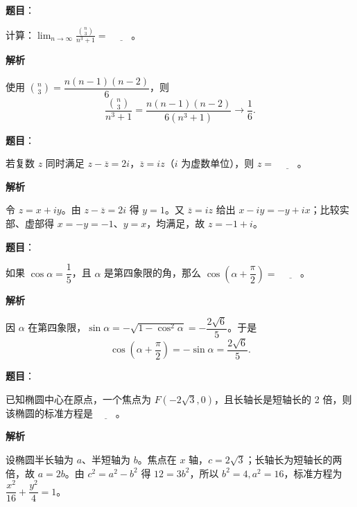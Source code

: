 \begin{answer}

\textbf{题目}：

计算：$\displaystyle\lim_{n\to\infty}\frac{\binom n3}{n^3+1}=$ $\underline{\qquad}$。

\textbf{解析}

使用 $\binom n3=\dfrac{n(n-1)(n-2)}6$，则
\nopagebreak[4]
\[
\frac{\binom n3}{n^3+1}
=\frac{n(n-1)(n-2)}{6(n^3+1)}\longrightarrow\frac16.
\]


\end{answer}
\begin{answer}

\textbf{题目}：

若复数 $z$ 同时满足 $z-\overline z=2i$，$\overline z=iz$（$i$ 为虚数单位），则 $z=$ $\underline{\qquad}$。

\textbf{解析}

令 $z=x+iy$。由 $z-\overline z=2i$ 得 $y=1$。又 $\overline z=iz$ 给出 $x-iy=-y+ix$；比较实部、虚部得 $x=-y=-1$、$y=x$，均满足，故 $z=-1+i$。


\end{answer}
\begin{answer}

\textbf{题目}：

如果 $\cos\alpha=\dfrac15$，且 $\alpha$ 是第四象限的角，那么 $\cos\left(\alpha+\dfrac\pi2\right)=$ $\underline{\qquad}$。

\textbf{解析}

因 $\alpha$ 在第四象限，$\sin\alpha=-\sqrt{1-\cos^2\alpha}=-\dfrac{2\sqrt6}{5}$。于是
\nopagebreak[4]
\[
\cos\left(\alpha+\frac\pi2\right)=-\sin\alpha=\frac{2\sqrt6}{5}.
\]


\end{answer}
\begin{answer}

\textbf{题目}：

已知椭圆中心在原点，一个焦点为 $F(-2\sqrt3,0)$，且长轴长是短轴长的 2 倍，则该椭圆的标准方程是 $\underline{\qquad}$。

\textbf{解析}

设椭圆半长轴为 $a$、半短轴为 $b$。焦点在 $x$ 轴，$c=2\sqrt3$；长轴长为短轴长的两倍，故 $a=2b$。由 $c^2=a^2-b^2$ 得 $12=3b^2$，所以 $b^2=4,a^2=16$，标准方程为 $\dfrac{x^2}{16}+\dfrac{y^2}{4}=1$。


\end{answer}

